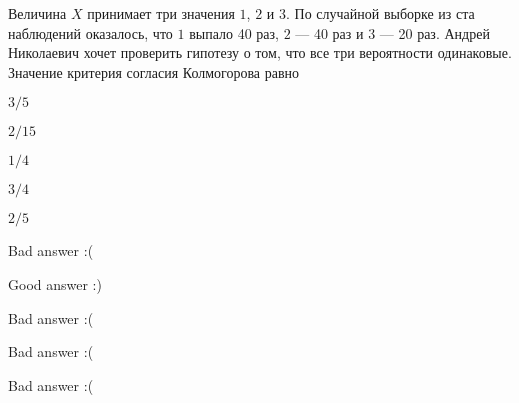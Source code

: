 
\begin{question}
Величина \(X\) принимает три значения \(1\), \(2\) и \(3\). По случайной
выборке из ста наблюдений оказалось, что \(1\) выпало 40 раз, \(2\) ---
40 раз и \(3\) --- 20 раз. Андрей Николаевич хочет проверить гипотезу о
том, что все три вероятности одинаковые. Значение критерия согласия
Колмогорова равно
\begin{answerlist}
  \item \(3/5\)
  \item \(2/15\)
  \item \(1/4\)
  \item \(3/4\)
  \item \(2/5\)
\end{answerlist}
\end{question}

\begin{solution}
\begin{answerlist}
  \item Bad answer :(
  \item Good answer :)
  \item Bad answer :(
  \item Bad answer :(
  \item Bad answer :(
\end{answerlist}
\end{solution}

